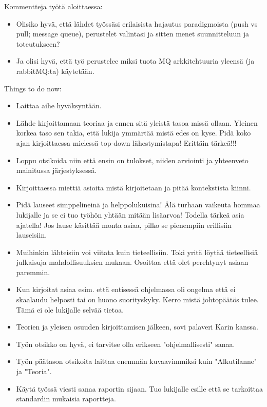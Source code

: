 \begin{it}
	Kommentteja työtä aloittaessa:
	\begin{itemize}
		\item Olisiko hyvä, että lähdet työssäsi erilaisista hajautus paradigmoista (push vs pull; message queue), perustelet valintasi ja sitten menet suunnitteluun ja toteutukseen?
		\item Ja olisi hyvä, että työ perustelee miksi tuota MQ arkkitehtuuria yleensä (ja rabbitMQ:ta) käytetään.
	\end{itemize}
	
	Things to do now:
	\begin{itemize}
		\item Laittaa aihe hyväksyntään.
		\item Lähde kirjoittamaan teoriaa ja ennen sitä yleistä tasoa missä ollaan. Yleinen korkea taso sen takia, että lukija ymmärtää mistä edes on kyse. Pidä koko ajan kirjoittaessa mielessä top-down lähestymistapa! Erittäin tärkeä!!!
		\item Loppu otsikoida niin että ensin on tulokset, niiden arviointi ja yhteenveto mainitussa järjestyksessä.
		\item Kirjoittaessa miettiä asioita mistä kirjoitetaan ja pitää kontekstista kiinni.
		\item Pidä lauseet simppelineinä ja helppolukuisina! Älä turhaan vaikeuta hommaa lukijalle ja se ei tuo työhön yhtään mitään lisäarvoa! Todella tärkeä asia ajatella! Jos lause käsittää monta asiaa, pilko se pienempiin erillisiin lauseisiin.
		\item Muihinkin lähteisiin voi viitata kuin tieteellisiin. Toki yritä löytää tieteellisiä julkaisuja mahdollisuuksien mukaan. Osoittaa että olet perehtynyt asiaan paremmin.
		\item Kun kirjoitat asiaa esim. että entisessä ohjelmassa oli ongelma että ei skaalaudu helposti tai on huono suorityskyky. Kerro mistä johtopäätös tulee. Tämä ei ole lukijalle selvää tietoa.
		\item Teorien ja yleisen osuuden kirjoittamisen jälkeen, sovi palaveri Karin kanssa.
		\item Työn otsikko on hyvä, ei tarvitse olla erikseen "ohjelmallisesti" sanaa.
		\item Työn päätason otsikoita laittaa enemmän kuvaavimmiksi kuin "Alkutilanne" ja "Teoria".
		\item Käytä työssä viesti sanaa raportin sijaan. Tuo lukijalle esille että se tarkoittaa standardin mukaisia raportteja.
	\end{itemize}
	

\end{it}
